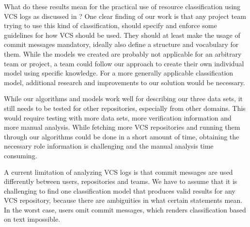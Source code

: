 What do these results mean for the practical use of resource classification using VCS logs as discussed in ? One clear finding of our work is that any project team trying to use this kind of classification, should specify and enforce some guidelines for how VCS should be used. They should at least make the usage of commit messages mandatory, ideally also define a structure and vocabulary for them. While the models we created are probably not applicable for an arbitrary team or project, a team could follow our approach to create their own individual model using specific knowledge. For a more generally applicable classification model, additional research and improvements to our solution would be necessary. 

While our algorithms and models work well for describing our three data sets, it still needs to be tested for other repositories, especially from other domains. This would require testing with more data sets, more verification information and more manual analysis. While fetching more VCS repositories and running them through our algorithms could be done in a short amount of time, obtaining the necessary role information is challenging and the manual analysis time consuming.

A current limitation of analyzing VCS logs is that commit messages are used differently between users, repositories and teams. We have to assume that it is challenging to find one classification model that produces valid results for any VCS repository, because there are ambiguities in what certain statements mean. In the worst case, users omit commit messages, which renders classification based on text impossible.


